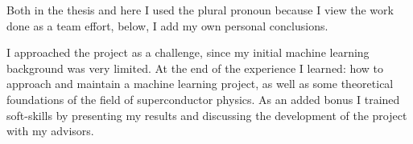 \documentclass[a4paper, notitlepage]{article}
\begin{document}
Both in the thesis and here I used the plural pronoun because I view the work done as a team effort,
below, I add my own personal conclusions.

I approached the project as a challenge, since my initial machine learning background was very
limited. At the end of the experience I learned: how to approach and maintain a machine learning
project, as well as some theoretical foundations of the field of superconductor physics. As an added
bonus I trained soft-skills by presenting my results and discussing the development of the project
with my advisors.

\printbibliography
\end{document}
